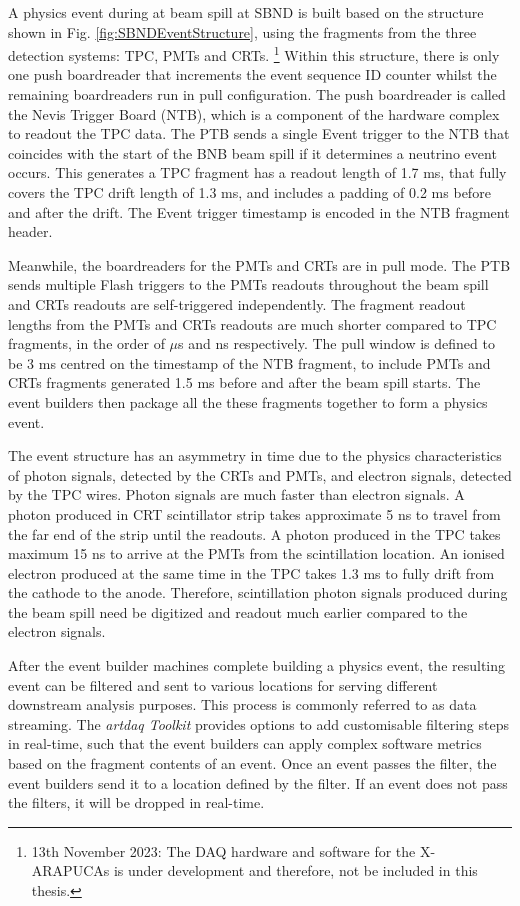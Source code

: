 A physics event during at beam spill at SBND is built based on the structure shown in Fig. \ref{fig:SBNDEventStructure}, using the fragments from the three detection systems: TPC, PMTs and CRTs.
\footnote{13th November 2023: The DAQ hardware and software for the X-ARAPUCAs is under development and therefore, not be included in this thesis. }
Within this structure, there is only one push boardreader that increments the event sequence ID counter whilst the remaining boardreaders run in pull configuration.
The push boardreader is called the Nevis Trigger Board (NTB), which is a component of the hardware complex to readout the TPC data. 
The PTB sends a single Event trigger to the NTB that coincides with the start of the BNB beam spill if it determines a neutrino event occurs.
This generates a TPC fragment has a readout length of 1.7 ms, that fully covers the TPC drift length of 1.3 ms, and includes a padding of 0.2 ms before and after the drift.
The Event trigger timestamp is encoded in the NTB fragment header.

Meanwhile, the boardreaders for the PMTs and CRTs are in pull mode.
The PTB sends multiple Flash triggers to the PMTs readouts throughout the beam spill and CRTs readouts are self-triggered independently.
The fragment readout lengths from the PMTs and CRTs readouts are much shorter compared to TPC fragments, in the order of $\mu$s and ns respectively.
The pull window is defined to be 3 ms centred on the timestamp of the NTB fragment, to include PMTs and CRTs fragments generated 1.5 ms before and after the beam spill starts.
The event builders then package all the these fragments together to form a physics event.

The event structure has an asymmetry in time due to the physics characteristics of photon signals, detected by the CRTs and PMTs, and electron signals, detected by the TPC wires.
Photon signals are much faster than electron signals.
A photon produced in CRT scintillator strip takes approximate 5 ns to travel from the far end of the strip until the readouts.
A photon produced in the TPC takes maximum 15 ns to arrive at the PMTs from the scintillation location.
An ionised electron produced at the same time in the TPC takes 1.3 ms to fully drift from the cathode to the anode.
Therefore, scintillation photon signals produced during the beam spill need be digitized and readout much earlier compared to the electron signals.

After the event builder machines complete building a physics event, the resulting event can be filtered and sent to various locations for serving different downstream analysis purposes. 
This process is commonly referred to as data streaming.
The \textit{artdaq Toolkit} provides options to add customisable filtering steps in real-time, such that the event builders can apply complex software metrics based on the fragment contents of an event.
Once an event passes the filter, the event builders send it to a location defined by the filter.
If an event does not pass the filters, it will be dropped in real-time.

